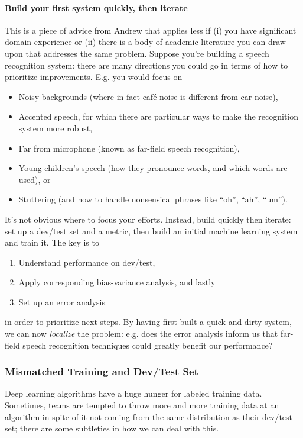 \documentclass[12pt]{article}
\begin{document}
\paragraph{Build your first system quickly, then iterate} This is a piece of advice from Andrew 
that applies less if (i) you have significant domain experience or (ii) there is a body of academic literature
you can draw upon that addresses the same problem. 
Suppose you're building a speech recognition system: there are many directions you could go in terms of how to prioritize 
improvements. E.g. you would focus on
\begin{itemize}[topsep=2pt,itemsep=0.5pt,partopsep=1pt,parsep=1pt]
  \item Noisy backgrounds (where in fact caf\'e noise is different from car noise),
  \item Accented speech, for which there are particular ways to make the recognition system more robust,
  \item Far from microphone (known as far-field speech recognition),
  \item Young children's speech (how they pronounce words, and which words are used), or
  \item Stuttering (and how to handle nonsensical phrases like ``oh'', ``ah'', ``um''). \end{itemize}
It's not obvious where to focus your efforts. Instead, build quickly then iterate: set up a dev/test set and
a metric, then build an initial machine learning system and train it. The key is to
\begin{enumerate}[topsep=2pt,itemsep=0.5pt,partopsep=1pt,parsep=1pt] \item Understand performance on dev/test, 
\item Apply corresponding bias-variance analysis, and lastly
\item Set up an error analysis \end{enumerate}
in order to prioritize next steps. By having first built a quick-and-dirty system, 
we can now \emph{localize} the problem: e.g. does the error
analysis inform us that far-field speech recognition techniques could greatly benefit our performance?

\subsubsection{Mismatched Training and Dev/Test Set} Deep learning algorithms have a huge hunger for 
labeled training data. Sometimes, teams are tempted to throw more and more training data at an algorithm
in spite of it not coming from the same distribution as their dev/test set; there are some subtleties
in how we can deal with this.
\end{document}
